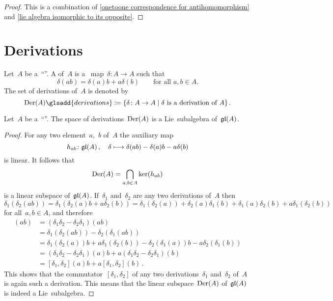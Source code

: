\begin{proof}
  This is a combination of \cref{onetoone correspondence for antihomomorphism} and \cref{lie algebra isomorphic to its opposite}.
\end{proof}





\section{Derivations}


\begin{definition}
  Let~$A$ be a~\enquote{\algebra{$\kf$}}.
  A  of~$A$ is a~{\linear{$\kf$}} map~$\delta \colon A \to A$ such that
  \[
    \delta(ab)
    =
    \delta(a) b + a \delta(b)
    \qquad
    \text{for all~$a, b \in A$.}
  \]
  The set of derivations of~$A$ is denoted by
  \[
    \Der(A)\glsadd{derivations}
    \defined
    \{
      \delta
      \colon
      A
      \textstyle\to
      A
    \suchthat
      \text{$\delta$ is a derivation of~$A$}
    \}  \,.
  \]
\end{definition}


\begin{proposition}
  Let~$A$ be a~\enquote{\algebra{$\kf$}}.
  The space of derivations~$\operatorname{Der}(A)$ is a Lie~subalgebra of~$\mathfrak{gl}(A)$.
\end{proposition}


\begin{proof}
  For any two element~$a$,~$b$ of~$A$ the auxiliary map
  \[
    h_{ab}
    \colon
    \gllie(A) \,,
    \quad
    \delta
    \mapsto
    \delta(ab) - \delta(a)b - a \delta(b)
  \]
  is linear.
  It follows that
  \[
    \operatorname{Der}(A)
    =
    \bigcap_{a, b \in A}
    \ker( h_{ab} )
  \]
  is a linear subspace of~$\mathfrak{gl}(A)$.
  If~$\delta_1$ and~$\delta_2$ are any two derivations of~$A$ then
  \[
    \delta_1( \delta_2(ab) )
    =
    \delta_1( \delta_2(a) b + a \delta_2(b) )
    =
    \delta_1(\delta_2(a)) + \delta_2(a) \delta_1(b)
    + \delta_1(a) \delta_2(b) + a \delta_1( \delta_2(b) )
  \]
  for all~$a, b \in A$, and therefore
  \begin{align*}
    [\delta_1, \delta_2](ab)
    &=
    (\delta_1 \delta_2 - \delta_2 \delta_1)(ab)
    \\
    &=
    \delta_1( \delta_2(ab) ) - \delta_2( \delta_1(ab) )
    \\
    &=
    \delta_1(\delta_2(a)) b + a \delta_1(\delta_2(b))
    - \delta_2(\delta_1(a)) b - a \delta_2(\delta_1(b))
    \\
    &=
    (\delta_1 \delta_2 - \delta_2 \delta_1)(a) b
    + a (\delta_1 \delta_2 - \delta_2 \delta_1)(b)
    \\
    &=
    [\delta_1, \delta_2](a) b + a [\delta_1, \delta_2](b) \,.
  \end{align*}
  This shows that the commutator~$[\delta_1, \delta_2]$ of any two derivations~$\delta_1$ and~$\delta_2$ of~$A$ is again such a derivation.
  This means that the linear subspace~$\operatorname{Der}(A)$ of~$\mathfrak{gl}(A)$ is indeed a Lie~subalgebra.
\end{proof}



